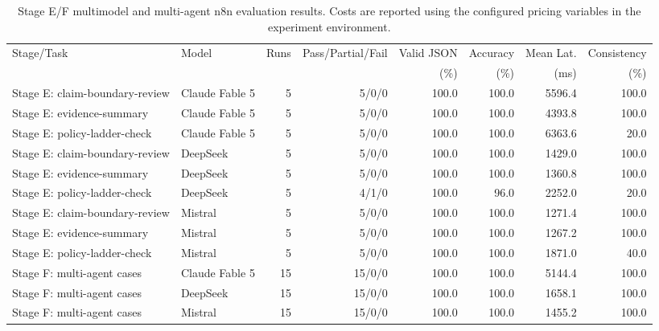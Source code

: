 \begin{table}[t]
\centering
\caption{Stage E/F multimodel and multi-agent n8n evaluation results. Costs are reported using the configured pricing variables in the experiment environment.}
\label{tab:stage-ef-n8n-results}
\scriptsize
\begin{tabular}{llrrrrrr}
\hline
Stage/Task & Model & Runs & Pass/Partial/Fail & Valid JSON & Accuracy & Mean Lat. & Consistency \\
 & & & & (\%) & (\%) & (ms) & (\%) \\
\hline
Stage E: claim-boundary-review & Claude Fable 5 & 5 & 5/0/0 & 100.0 & 100.0 & 5596.4 & 100.0 \\
Stage E: evidence-summary & Claude Fable 5 & 5 & 5/0/0 & 100.0 & 100.0 & 4393.8 & 100.0 \\
Stage E: policy-ladder-check & Claude Fable 5 & 5 & 5/0/0 & 100.0 & 100.0 & 6363.6 & 20.0 \\
Stage E: claim-boundary-review & DeepSeek & 5 & 5/0/0 & 100.0 & 100.0 & 1429.0 & 100.0 \\
Stage E: evidence-summary & DeepSeek & 5 & 5/0/0 & 100.0 & 100.0 & 1360.8 & 100.0 \\
Stage E: policy-ladder-check & DeepSeek & 5 & 4/1/0 & 100.0 & 96.0 & 2252.0 & 20.0 \\
Stage E: claim-boundary-review & Mistral & 5 & 5/0/0 & 100.0 & 100.0 & 1271.4 & 100.0 \\
Stage E: evidence-summary & Mistral & 5 & 5/0/0 & 100.0 & 100.0 & 1267.2 & 100.0 \\
Stage E: policy-ladder-check & Mistral & 5 & 5/0/0 & 100.0 & 100.0 & 1871.0 & 40.0 \\
Stage F: multi-agent cases & Claude Fable 5 & 15 & 15/0/0 & 100.0 & 100.0 & 5144.4 & 100.0 \\
Stage F: multi-agent cases & DeepSeek & 15 & 15/0/0 & 100.0 & 100.0 & 1658.1 & 100.0 \\
Stage F: multi-agent cases & Mistral & 15 & 15/0/0 & 100.0 & 100.0 & 1455.2 & 100.0 \\
\hline
\end{tabular}
\end{table}
